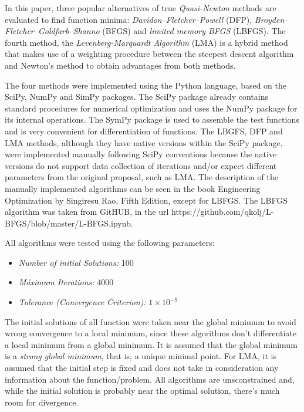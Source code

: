 \documentclass[conference]{IEEEtran}
\begin{document}
In this paper, three popular alternatives of true \textit{Quasi-Newton} methods are evaluated to find function minima: \textit{Davidon–Fletcher–Powell} (DFP), \textit{Broyden–Fletcher–Goldfarb–Shanno} (BFGS) and \textit{limited memory BFGS} (LBFGS). The fourth method, the \textit{Levenberg-Marquardt Algorithm} (LMA) is a hybrid method that makes use of a weighting procedure between the steepest descent algorithm and Newton's method to obtain advantages from both methods.

The four methods were implemented using the Python language, based on the SciPy, NumPy and SimPy packages. The SciPy package already contains standard procedures for numerical optimization and uses the NumPy package for its internal operations. The SymPy package is used to assemble the test functions and is very convenient for differentiation of functions. The LBGFS, DFP and LMA methods, although they have native versions within the SciPy package, were implemented manually following SciPy conventions because the native versions do not support data collection of iterations and/or expect different parameters from the original proposal, such as LMA. The description of the manually implemented algorithms can be seen in the book Engineering Optimization by Singiresu Rao, Fifth Edition, except for LBFGS. The LBFGS algorithm was taken from GitHUB, in the url https://github.com/qkolj/L-BFGS/blob/master/L-BFGS.ipynb.

All algorithms were tested using the following parameters:

\begin{itemize}
	\item \textit{Number of initial Solutions:} 100
	\item \textit{Máximum Iterations:} 4000
	\item \textit{Tolerance (Convergence Criterion): } $1 \times 10^{-9}$
\end{itemize}

The initial solutions of all function were taken near the global minimum to avoid wrong convergence to a local minimum, since these algorithms don't differentiate a local minimum from a global minimum. It is assumed that the global minimum is a \textit{strong global minimum}, that is, a unique minimal point. For LMA, it is assumed that the initial step is fixed and does not take in consideration any information about the function/problem. All algorithms are unsconstrained and, while the initial solution is probably near the optimal solution, there's much room for divergence.
\end{document}
